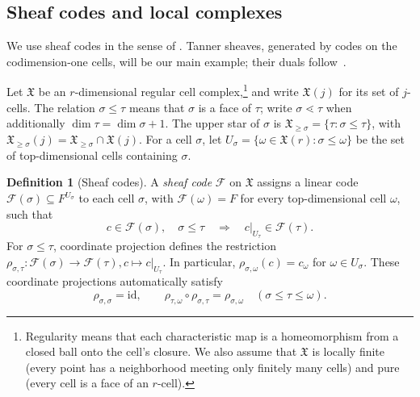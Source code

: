 \documentclass[11pt,letterpaper]{article}
\renewcommand{\le}{\leqslant}
\renewcommand{\ge}{\geqslant}
\theoremstyle{definition}
\newtheorem{definition}[theorem]{Definition}
\theoremstyle{remark}
\newcommand{\cF}{\mathcal F}
\newcommand{\X}{\mathfrak{X}}
\begin{document}
\subsection{Sheaf codes and local complexes}
\label{sec:cubical-sheaf}\label{sec:sheaf-definition}
We use sheaf codes in the sense of
\cite[Section~III-B]{PanteleevKalachev2024}. Tanner sheaves, generated
by codes on the codimension-one cells, will be our main example;
their duals follow~\cite[Definitions~3.10--3.11]{LiEtAl2025}.

Let $\X$ be an $r$-dimensional regular cell complex,\footnote{Regularity
means that each characteristic map is a homeomorphism from a closed
ball onto the cell's closure. We also assume that $\X$ is locally
finite (every point has a neighborhood meeting only finitely many
cells) and pure (every cell is a face of an $r$-cell).}
and write $\X(j)$ for its set of $j$-cells.
The relation $\sigma\le\tau$ means that $\sigma$ is a face of $\tau$;
write $\sigma\lessdot\tau$ when additionally
$\dim\tau=\dim\sigma+1$. The upper star of $\sigma$ is
$\X_{\ge\sigma}=\{\tau:\sigma\le\tau\}$, with
$\X_{\ge\sigma}(j)=\X_{\ge\sigma}\cap\X(j)$.
For a cell $\sigma$, let $U_\sigma=\{\omega\in\X(r):\sigma\le\omega\}$
be the set of top-dimensional cells containing $\sigma$.

\begin{definition}[Sheaf codes]
\label{def:sheaf-code}
A \emph{sheaf code} $\cF$ on $\X$ assigns a linear code
$\cF(\sigma)\subseteq F^{U_\sigma}$ to each cell $\sigma$, with
$\cF(\omega)=F$ for every top-dimensional cell $\omega$, such that
\[
 c\in\cF(\sigma),\quad \sigma\le\tau
 \quad\Longrightarrow\quad c|_{U_\tau}\in\cF(\tau).
\]
For $\sigma\le\tau$, coordinate projection defines the restriction
$
 \rho_{\sigma,\tau}:\cF(\sigma)\longrightarrow\cF(\tau),c\longmapsto c|_{U_\tau}.
$
In particular, $\rho_{\sigma,\omega}(c)=c_\omega$ for
$\omega\in U_\sigma$.
These coordinate projections automatically satisfy
\[
 \rho_{\sigma,\sigma}=\mathrm{id},\qquad
 \rho_{\tau,\omega}\circ\rho_{\sigma,\tau}
 =\rho_{\sigma,\omega}\quad(\sigma\le\tau\le\omega).
\]
\end{definition}
\end{document}
